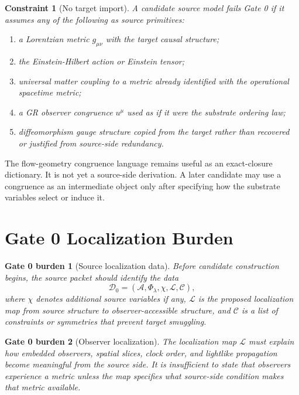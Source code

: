 \documentclass[11pt]{article}
\newcommand{\Sub}{\mathcal{A}}
\newtheorem{burden}{Gate 0 burden}
\newtheorem{constraint}{Constraint}
\begin{document}
\begin{constraint}[No target import]
A candidate source model fails Gate 0 if it assumes any of the following as
source primitives:
\begin{enumerate}
    \item a Lorentzian metric \(g_{\mu\nu}\) with the target causal structure;
    \item the Einstein-Hilbert action or Einstein tensor;
    \item universal matter coupling to a metric already identified with the
    operational spacetime metric;
    \item a GR observer congruence \(u^\mu\) used as if it were the substrate
    ordering law;
    \item diffeomorphism gauge structure copied from the target rather than
    recovered or justified from source-side redundancy.
\end{enumerate}
\end{constraint}

The flow-geometry congruence language remains useful as an exact-closure
dictionary. It is not yet a source-side derivation. A later candidate may use a
congruence as an intermediate object only after specifying how the substrate
variables select or induce it.

\section{Gate 0 Localization Burden}

\begin{burden}[Source localization data]
Before candidate construction begins, the source packet should identify the
data
\[
\mathcal{D}_{0}
=
(\Sub,\Phi_{\lambda},\chi,\mathcal{L},\mathcal{C}),
\]
where \(\chi\) denotes additional source variables if any,
\(\mathcal{L}\) is the proposed localization map from source structure to
observer-accessible structure, and \(\mathcal{C}\) is a list of constraints
or symmetries that prevent target smuggling.
\end{burden}

\begin{burden}[Observer localization]
The localization map \(\mathcal{L}\) must explain how embedded observers,
spatial slices, clock order, and lightlike propagation become meaningful from
the source side. It is insufficient to state that observers experience a
metric unless the map specifies what source-side condition makes that metric
available.
\end{burden}
\end{document}
